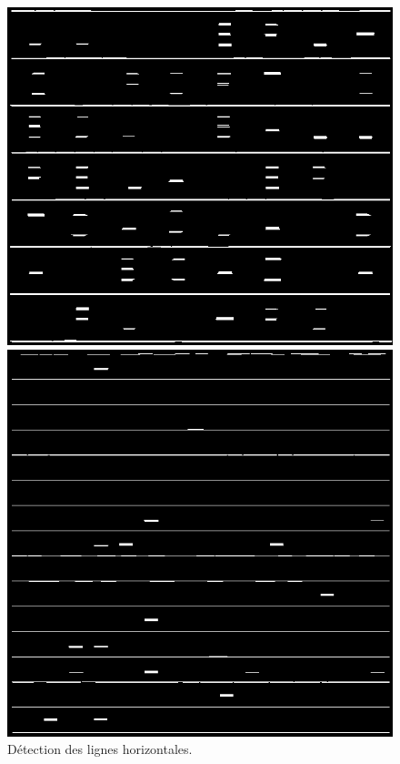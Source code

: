 \documentclass{article}
\begin{document}
\begin{figure}[H]
  \centering
      \includegraphics[width=\linewidth]{ressources/image_1_step_09_horizontal_lines.png}
      \caption{}
    \endminipage\quad\quad\quad\quad
    \includegraphics[width=\linewidth]{ressources/image_2_step_09_horizontal_lines.png}
    \caption{}
  \endminipage
  \caption{Détection des lignes horizontales.}
\end{figure}
\end{document}
